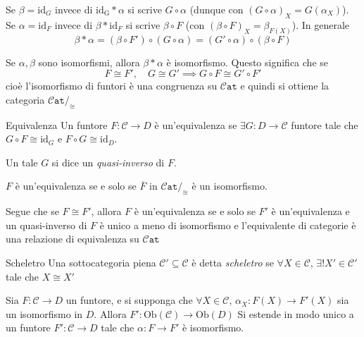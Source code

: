 \begin{note}[zione]
    Se \(\beta = \mathrm{id}_G \) invece di \(\mathrm{id_G} * \alpha\) si scrive
    \(G \circ \alpha\) (dunque con \({(G \circ \alpha)}_X = G{(\alpha_X)}\)). Se
    \(\alpha = \mathrm{id}_F\) invece di \(\beta * \mathrm{id}_F\) si scrive \(\beta \circ F\) (con \({(\beta \circ F)}_X = \beta_{F{(X)}} \)). In generale 
    \[
      \beta * \alpha = {(\beta \circ F')} \circ {(G \circ \alpha)} = {(G' \circ
      \alpha)} \circ {(\beta \circ F)}
    \]
\end{note}
\begin{remark}{}
    Se \(\alpha, \beta\) sono isomorfismi, allora \(\beta * \alpha\) è
    isomorfismo. Questo significa che se 
    \[
      F \cong F', \quad G \cong G' \implies G \circ F \cong G' \circ F'
    \]
    cioè l'isomorfismo di funtori è una congruenza su \(
    \mathtt{\mathcal{C}at}\) e quindi si ottiene la categoria \(\mathtt{\mathcal{C}at} /_{\cong}\)
\end{remark}
\begin{definition}{Equivalenza}
    Un funtore \(F: \mathcal{C} \to D\) è un'equivalenza se \(\exists G : D \to \mathcal{C}\)
    funtore tale che \(G \circ F \cong \mathrm{id}_G\) e \(F \circ G \cong \mathrm{id}_D\).

    Un tale \(G\) si dice un \emph{quasi-inverso} di \(F\).
\end{definition}
\begin{remark}{}
    \(F\) è un'equivalenza se e solo se \(\overline{F} \text{ in } \mathtt{\mathcal{C}at}/_{\cong} \) è un isomorfismo.
\end{remark}

Segue che se \(F \cong F'\), allora \(F\) è un'equivalenza se e solo se \(F'\) è
un'equivalenza e un quasi-inverso di \(F\) è unico a meno di isomorfismo e
l'equivalente di categorie è una relazione di equivalenza su \(\mathtt{\mathcal{C}at}\) 

\begin{definition}{Scheletro}
    Una sottocategoria piena \(\mathcal{C}' \subseteq \mathcal{C} \) è detta \emph{scheletro} se \(\forall X \in \mathcal{C}\), \(\exists ! X' \in \mathcal{C}'\) tale che \(X \cong X'\) 
\end{definition}

\begin{lemma}{}\label{lem:ext-scheletro}
    Sia \(F: \mathcal{C}\to D\) un funtore, e si supponga che \(\forall X \in \mathcal{C}\), \(\alpha_X : F{(X)} \to F'{(X)}\) sia un isomorfismo in \(D\). Allora \(F' : \mathrm{Ob}{(\mathcal{C})} \to \mathrm{Ob}{(D)}\) Si estende in modo unico a un funtore \(F' : \mathcal{C} \to D\) tale che \(\alpha : F \to F'\) è isomorfismo.
\end{lemma}

